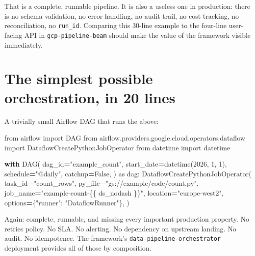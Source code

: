 \documentclass[
  11pt,
  british,
  oneside]{book}
\newenvironment{Shaded}{\begin{snugshade}}{\end{snugshade}}
\newcommand{\ControlFlowTok}[1]{\textcolor[rgb]{0.13,0.29,0.53}{\textbf{#1}}}
\newcommand{\DecValTok}[1]{\textcolor[rgb]{0.00,0.00,0.81}{#1}}
\newcommand{\ImportTok}[1]{#1}
\newcommand{\NormalTok}[1]{#1}
\newcommand{\OperatorTok}[1]{\textcolor[rgb]{0.81,0.36,0.00}{\textbf{#1}}}
\newcommand{\SpecialCharTok}[1]{\textcolor[rgb]{0.00,0.00,0.00}{#1}}
\newcommand{\StringTok}[1]{\textcolor[rgb]{0.31,0.60,0.02}{#1}}
\newcommand{\VariableTok}[1]{\textcolor[rgb]{0.00,0.00,0.00}{#1}}
\begin{document}
That is a complete, runnable pipeline. It is also a useless one in
production: there is no schema validation, no error handling, no audit
trail, no cost tracking, no reconciliation, no \texttt{run\_id}.
Comparing this 30-line example to the four-line user-facing API in
\texttt{gcp-pipeline-beam} should make the value of the framework
visible immediately.

\hypertarget{the-simplest-possible-orchestration-in-20-lines}{%
\section{The simplest possible orchestration, in 20
lines}\label{the-simplest-possible-orchestration-in-20-lines}}

A trivially small Airflow DAG that runs the above:

\begin{Shaded}
\begin{Highlighting}[]
\ImportTok{from}\NormalTok{ airflow }\ImportTok{import}\NormalTok{ DAG}
\ImportTok{from}\NormalTok{ airflow.providers.google.cloud.operators.dataflow }\ImportTok{import}\NormalTok{ DataflowCreatePythonJobOperator}
\ImportTok{from}\NormalTok{ datetime }\ImportTok{import}\NormalTok{ datetime}

\ControlFlowTok{with}\NormalTok{ DAG(}
\NormalTok{    dag\_id}\OperatorTok{=}\StringTok{"example\_count"}\NormalTok{,}
\NormalTok{    start\_date}\OperatorTok{=}\NormalTok{datetime(}\DecValTok{2026}\NormalTok{, }\DecValTok{1}\NormalTok{, }\DecValTok{1}\NormalTok{),}
\NormalTok{    schedule}\OperatorTok{=}\StringTok{"@daily"}\NormalTok{,}
\NormalTok{    catchup}\OperatorTok{=}\VariableTok{False}\NormalTok{,}
\NormalTok{) }\ImportTok{as}\NormalTok{ dag:}
\NormalTok{    DataflowCreatePythonJobOperator(}
\NormalTok{        task\_id}\OperatorTok{=}\StringTok{"count\_rows"}\NormalTok{,}
\NormalTok{        py\_file}\OperatorTok{=}\StringTok{"gs://example/code/count.py"}\NormalTok{,}
\NormalTok{        job\_name}\OperatorTok{=}\StringTok{"example{-}count{-}}\SpecialCharTok{\{\{}\StringTok{ ds\_nodash }\SpecialCharTok{\}\}}\StringTok{"}\NormalTok{,}
\NormalTok{        location}\OperatorTok{=}\StringTok{"europe{-}west2"}\NormalTok{,}
\NormalTok{        options}\OperatorTok{=}\NormalTok{\{}\StringTok{"runner"}\NormalTok{: }\StringTok{"DataflowRunner"}\NormalTok{\},}
\NormalTok{    )}
\end{Highlighting}
\end{Shaded}

Again: complete, runnable, and missing every important production
property. No retries policy. No SLA. No alerting. No dependency on
upstream landing. No audit. No idempotence. The framework's
\texttt{data-pipeline-orchestrator} deployment provides all of those by
composition.
\end{document}
